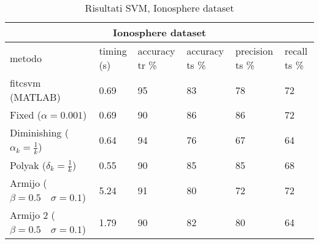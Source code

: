 \documentclass{article}
\begin{document}
\begin{table}[]
    \centering
    \begin{tabular}{ |p{3cm}||p{1.5cm}|p{2cm}|p{2cm}|p{2cm}|p{1.5cm}|  }
    \hline
    \multicolumn{6}{|c|}{Ionosphere dataset} \\
    \hline
    metodo & timing (s) & accuracy tr \% & accuracy ts \% & precision ts \% & recall ts \%\\
    \hline
    fitcsvm (MATLAB) & 0.69  & 95 & 83 & 78 & 72\\
    \hline
    Fixed ($\alpha = 0.001$) & 0.69 & 90 & 86 & 86 & 72\\
    \hline
    Diminishing ($\alpha_k = \frac{1}{k}$) & 0.64 & 94 & 76 & 67 & 64\\
    \hline
    Polyak ($\delta_k = \frac{1}{k}$) & 0.55 & 90 & 85 & 85 & 68\\
    \hline
    Armijo ($\beta = 0.5 \quad \sigma = 0.1$) & 5.24 & 91 & 80 & 72 & 72\\
    \hline
    Armijo 2 ($\beta = 0.5 \quad \sigma = 0.1$) & 1.79 & 90 & 82 & 80 & 64\\
    \hline
    \end{tabular}
    \caption{Risultati SVM, Ionosphere dataset}
    \label{table:svmresults}
\end{table}


\end{document}
